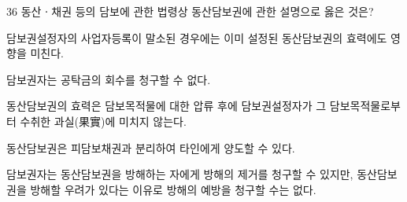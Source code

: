 \begin{question}{36}
동산ㆍ채권 등의 담보에 관한 법령상 동산담보권에 관한 설명으로 옳은 것은?
\begin{choices}
  \item 담보권설정자의 사업자등록이 말소된 경우에는 이미 설정된 동산담보권의 효력에도 영향을 미친다.
  \item 담보권자는 공탁금의 회수를 청구할 수 없다.
  \item 동산담보권의 효력은 담보목적물에 대한 압류 후에 담보권설정자가 그 담보목적물로부터 수취한 과실(果實)에 미치지 않는다.
  \item 동산담보권은 피담보채권과 분리하여 타인에게 양도할 수 있다.
  \item 담보권자는 동산담보권을 방해하는 자에게 방해의 제거를 청구할 수 있지만, 동산담보권을 방해할 우려가 있다는 이유로 방해의 예방을 청구할 수는 없다.
\end{choices}
\end{question}
